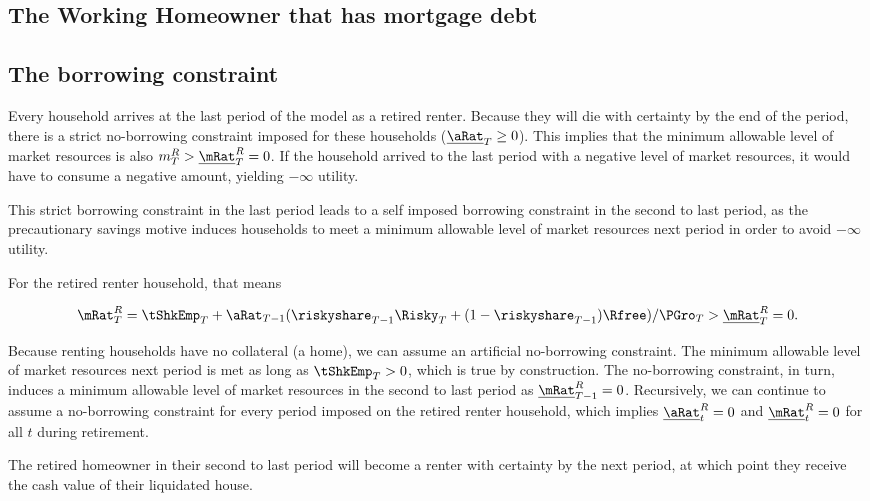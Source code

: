 \documentclass[PortfolioChoiceWithRiskyHousing]{subfiles}
\begin{document}
\subsection{The Working Homeowner that has mortgage debt}

\subsection{The borrowing constraint}

Every household arrives at the last period of the model as a retired renter. Because they will die with certainty by the end of the period, there is a strict no-borrowing constraint imposed for these households ($\underline{\aRat}_{T} \ge 0$). This implies that the minimum allowable level of market resources is also $m^R_{T} > \underline{\mRat}^R_{T} = 0$. If the household arrived to the last period with a negative level of market resources, it would have to consume a negative amount, yielding $-\infty$ utility.

This strict borrowing constraint in the last period leads to a self imposed borrowing constraint in the second to last period, as the precautionary savings motive induces households to meet a minimum allowable level of market resources next period in order to avoid $-\infty$ utility.

For the retired renter household, that means

\begin{equation}
	\mRat_{T}^R = \tShkEmp_{T} + \aRat_{T-1}(\riskyshare_{T-1}\Risky_{T} + (1-\riskyshare_{T-1})\Rfree)/\PGro_{T} > \underline{\mRat}^R_{T} = 0.
\end{equation}

Because renting households have no collateral (a home), we can assume an artificial no-borrowing constraint. The minimum allowable level of market resources next period is met as long as $\tShkEmp_{T} > 0$, which is true by construction. The no-borrowing constraint, in turn, induces a minimum allowable level of market resources in the second to last period as $\underline{\mRat}^R_{T-1} = 0$. Recursively, we can continue to assume a no-borrowing constraint for every period imposed on the retired renter household, which implies $\underline{\aRat}^R_{t}= 0$ and $\underline{\mRat}^R_{t} = 0$ for all $t$ during retirement.

The retired homeowner in their second to last period will become a renter with certainty by the next period, at which point they receive the cash value of their liquidated house.
\end{document}
